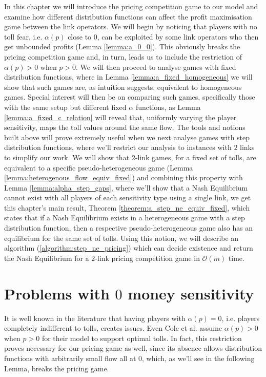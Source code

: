 \documentclass[10pt,a4paper]{book}
\theoremstyle{definition}
\theoremstyle{comment}
\begin{document}
In this chapter we will introduce the pricing competition game to our model and examine how different distribution functions can affect the profit maximisation game between the link operators.
We will begin by noticing that players with no toll fear, i.e. $\alpha(p)$ close to $0$, can be exploited by some link operators who then get unbounded profits (Lemma \ref{lemma:a_0_0}).
This obviously breaks the pricing competition game and, in turn, leads us to include the restriction of $\alpha(p) > 0$ when $p > 0$.
We will then proceed to analyse games with fixed distribution functions, where in Lemma \ref{lemma:a_fixed_homogeneous} we will show that such games are, as intuition suggests, equivalent to homogeneous games.
Special interest will then be on comparing such games, specifically those with the same setup but different fixed $\alpha$ functions, as Lemma \ref{lemma:a_fixed_c_relation} will reveal that, uniformly varying the player sensitivity, maps the toll values around the same flow.
The tools and notions built above will prove extremely useful when we next analyse games with step distribution functions, where we'll restrict our analysis to instances with $2$ links to simplify our work.
We will show that $2$-link games, for a fixed set of tolls, are equivalent to a specific pseudo-heterogeneous game  (Lemma \ref{lemma:heterogenous_flow_equiv_fixed}) and combining this property with Lemma \ref{lemma:alpha_step_gaps}, where we'll show that a Nash Equilibrium cannot exist with all players of each sensitivity type using a single link, we get this chapter's main result, Theorem \ref{theorem:a_step_ne_equiv_fixed}, which states that if a Nash Equilibrium exists in a heterogeneous game with a step distribution function, then a respective pseudo-heterogeneous game also has an equilibrium for the same set of tolls.
Using this notion, we will describe an algorithm (\ref{algorithm:step_ne_pricing}) which can decide existence and return the Nash Equilibrium for a $2$-link pricing competition game in $\mathcal{O}(m)$ time.

\section{Problems with $0$ money sensitivity}

It is well known in the literature that having players with $\alpha(p) = 0$, i.e. players completely indifferent to tolls, creates issues.
Even Cole et al. \cite{10.1145/780542.780618} assume $\alpha(p) > 0$ when $p > 0$ for their model to support optimal tolls.
In fact, this restriction proves necessary for our pricing game as well, since its absence allows distribution functions with arbitrarily small flow all at $0$, which, as we'll see in the following Lemma, breaks the pricing game.
\end{document}
